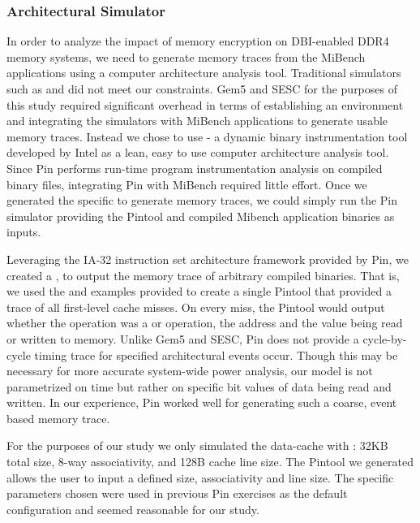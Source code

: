 \subsubsection{Architectural Simulator}
In order to analyze the impact of memory encryption on DBI-enabled DDR4 memory
systems, we need to generate memory traces from the MiBench applications using
a computer architecture analysis tool. Traditional simulators such as 
\cite{gem5} and  \cite{esesc} did not meet our constraints. Gem5 and
SESC for the purposes of this study required significant overhead in terms of
establishing an environment and integrating the simulators with MiBench
applications to generate usable memory traces. Instead we chose to use 
\cite{pin} - a dynamic binary instrumentation tool developed by Intel as a
lean, easy to use computer architecture analysis tool. Since Pin performs run-time
program instrumentation analysis on compiled binary files, integrating Pin with
MiBench required little effort. Once we generated the specific  to
generate memory traces, we could simply run the Pin simulator providing the
Pintool and compiled Mibench application binaries as inputs.

Leveraging the IA-32 instruction set architecture framework provided by Pin, we
created a , to output the memory trace of arbitrary compiled
binaries. That is, we used the  and  examples provided
to create a single Pintool that provided a trace of all first-level cache
misses. On every miss, the Pintool would output whether the operation was a
 or  operation, the address and the value being read or
written to memory. Unlike Gem5 and SESC, Pin does not provide a cycle-by-cycle
timing trace for specified architectural events occur. Though this may be
necessary for more accurate system-wide power analysis, our model is not
parametrized on time but rather on specific bit values of data being read and
written. In our experience, Pin worked well for generating such a coarse, event
based memory trace.

For the purposes of our study we only simulated the data-cache with : 32KB
total size, 8-way associativity, and 128B cache line size. The Pintool we
generated allows the user to input a defined size, associativity and line size.
The specific parameters chosen were used in previous Pin exercises as the
default configuration and seemed reasonable for our study.


